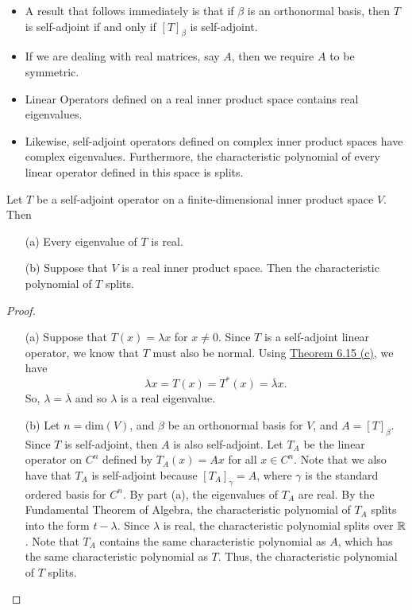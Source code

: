 \begin{itemize}
    \item A result that follows immediately is that if \( \beta  \) is an orthonormal basis, then \( T  \) is self-adjoint if and only if \( [T]_{\beta}  \) is self-adjoint.
    \item If we are dealing with real matrices, say \( A  \), then we require \( A  \) to be symmetric.
    \item Linear Operators defined on a real inner product space contains real eigenvalues.
    \item Likewise, self-adjoint operators defined on complex inner product spaces have complex eigenvalues. Furthermore, the characteristic polynomial of every linear operator defined in this space is splits.
\end{itemize}

\begin{lemma}\label{Lemma Prior to Theorem 6.17}
    Let \( T  \) be a self-adjoint operator on a finite-dimensional inner product space \( V  \). Then
    \begin{enumerate}
        \item[(a)] Every eigenvalue of \( T  \) is real.
        \item[(b)] Suppose that \( V  \) is a real inner product space. Then the characteristic polynomial of \( T  \) splits.
    \end{enumerate}
\end{lemma}

\begin{proof}
\begin{enumerate}
    \item[(a)] Suppose that \( T(x) = \lambda x  \) for \( x \neq 0  \). Since \( T  \) is a self-adjoint linear operator, we know that \( T  \) must also be normal. Using {\hyperref[Theorem 6.15]{Theorem 6.15 (c)}}, we have
        \[  \lambda x = T(x) = T^{*}(x) = \overline{\lambda }x.   \]
        So, \( \lambda = \overline{\lambda} \) and so \( \lambda  \) is a real eigenvalue.
    \item[(b)] Let \( n = \text{dim}(V) \), and \( \beta \) be an orthonormal basis for \( V  \), and \( A = [T]_{\beta} \). Since \( T  \) is self-adjoint, then \( A  \) is also self-adjoint. Let \( {T}_{A} \) be the linear operator on \( C^{n} \) defined by \( {T}_{A}(x) = Ax  \) for all \( x \in C^{n} \). Note that we also have that \( {T}_{A} \) is self-adjoint because \( [{T}_{A}]_{\gamma} = A  \), where \( \gamma  \) is the standard ordered basis for \( C^{n} \). By part (a), the eigenvalues of \( {T}_{A}  \) are real. By the Fundamental Theorem of Algebra, the characteristic polynomial of \( {T}_{A} \) splits into the form \( t - \lambda  \). Since \( \lambda  \) is real, the characteristic polynomial splits over \( \mathbb{R}  \). Note that \( {T}_{A} \) contains the same characteristic polynomial as \( A  \), which has the same characteristic polynomial as \( T  \). Thus, the characteristic polynomial of \( T   \) splits.
\end{enumerate}
\end{proof}

